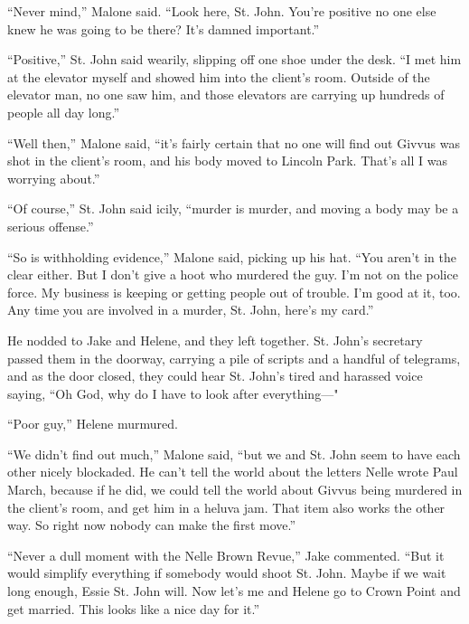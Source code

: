 \documentclass{novel}
\begin{document}
“Never mind,” Malone said. “Look here, St. John. You’re positive no one else knew he was going to be there? It’s damned important.”

“Positive,” St. John said wearily, slipping off one shoe under the desk. “I met him at the elevator myself and showed him into the client’s room. Outside of the elevator man, no one saw him, and those elevators are carrying up hundreds of people all day long.”

“Well then,” Malone said, “it’s fairly certain that no one will find out Givvus was shot in the client’s room, and his body moved to Lincoln Park. That’s all I was worrying about.”

“Of course,” St. John said icily, “murder is murder, and moving a body may be a serious offense.”

“So is withholding evidence,” Malone said, picking up his hat. “You aren’t in the clear either. But I don’t give a hoot who murdered the guy. I’m not on the police force. My business is keeping or getting people out of trouble. I’m good at it, too. Any time you are involved in a murder, St. John, here’s my card.”

He nodded to Jake and Helene, and they left together. St. John’s secretary passed them in the doorway, carrying a pile of scripts and a handful of telegrams, and as the door closed, they could hear St. John’s tired and harassed voice saying, “Oh God, why do I have to look after everything—"

“Poor guy,” Helene murmured.

“We didn’t find out much,” Malone said, “but we and St. John seem to have each other nicely blockaded. He can’t tell the world about the letters Nelle wrote Paul March, because if he did, we could tell the world about Givvus being murdered in the client’s room, and get him in a heluva jam. That item also works the other way. So right now nobody can make the first move.”

“Never a dull moment with the Nelle Brown Revue,” Jake commented. “But it would simplify everything if somebody would shoot St. John. Maybe if we wait long enough, Essie St. John will. Now let’s me and Helene go to Crown Point and get married. This looks like a nice day for it.”

\begin{ChapterStart}
\vspace{3\nbs}
\end{ChapterStart}
\end{document}
